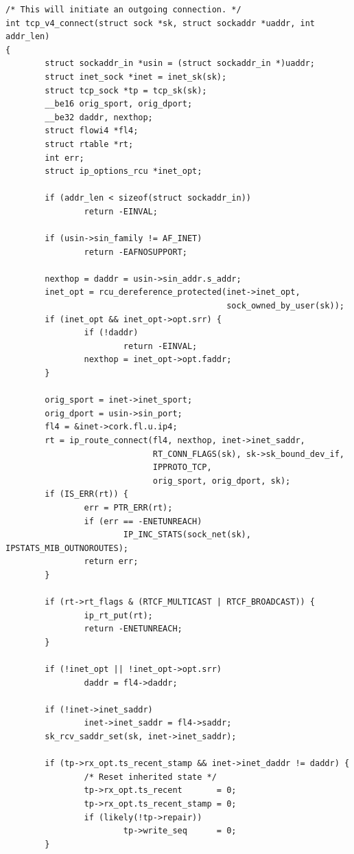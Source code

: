 \documentclass[11pt, a4paper,oneside]{book}
\theoremstyle{ocrenumbox}
\theoremstyle{purplenumbox}
\theoremstyle{blackbox}
\begin{document}
\begin{verbatim}
/* This will initiate an outgoing connection. */
int tcp_v4_connect(struct sock *sk, struct sockaddr *uaddr, int addr_len)
{
        struct sockaddr_in *usin = (struct sockaddr_in *)uaddr;
        struct inet_sock *inet = inet_sk(sk);
        struct tcp_sock *tp = tcp_sk(sk);
        __be16 orig_sport, orig_dport;
        __be32 daddr, nexthop;
        struct flowi4 *fl4;
        struct rtable *rt;
        int err;
        struct ip_options_rcu *inet_opt;

        if (addr_len < sizeof(struct sockaddr_in))
                return -EINVAL;

        if (usin->sin_family != AF_INET)
                return -EAFNOSUPPORT;

        nexthop = daddr = usin->sin_addr.s_addr;
        inet_opt = rcu_dereference_protected(inet->inet_opt,
                                             sock_owned_by_user(sk));
        if (inet_opt && inet_opt->opt.srr) {
                if (!daddr)
                        return -EINVAL;
                nexthop = inet_opt->opt.faddr;
        }

        orig_sport = inet->inet_sport;
        orig_dport = usin->sin_port;
        fl4 = &inet->cork.fl.u.ip4;
        rt = ip_route_connect(fl4, nexthop, inet->inet_saddr,
                              RT_CONN_FLAGS(sk), sk->sk_bound_dev_if,
                              IPPROTO_TCP,
                              orig_sport, orig_dport, sk);
        if (IS_ERR(rt)) {
                err = PTR_ERR(rt);
                if (err == -ENETUNREACH)
                        IP_INC_STATS(sock_net(sk), IPSTATS_MIB_OUTNOROUTES);
                return err;
        }

        if (rt->rt_flags & (RTCF_MULTICAST | RTCF_BROADCAST)) {
                ip_rt_put(rt);
                return -ENETUNREACH;
        }

        if (!inet_opt || !inet_opt->opt.srr)
                daddr = fl4->daddr;

        if (!inet->inet_saddr)
                inet->inet_saddr = fl4->saddr;
        sk_rcv_saddr_set(sk, inet->inet_saddr);

        if (tp->rx_opt.ts_recent_stamp && inet->inet_daddr != daddr) {
                /* Reset inherited state */
                tp->rx_opt.ts_recent       = 0;
                tp->rx_opt.ts_recent_stamp = 0;
                if (likely(!tp->repair))
                        tp->write_seq      = 0;
        }


\end{verbatim}
\end{document}

